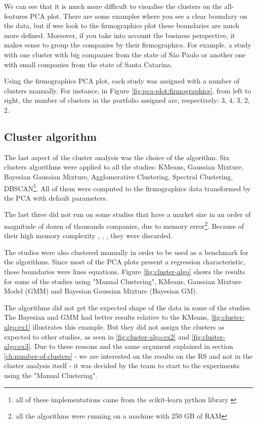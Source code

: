We can see that it is much more difficult to visualise the clusters on the all-features PCA plot. There are some examples where you see a clear boundary on the data, but if wee look to the firmographics plot these boundaries are much more defined. Moreover, if you take into account the business perspective, it makes sense to group the companies by their firmographics. For example, a study with one cluster with big companies from the state of São Paulo or another one with small companies from the state of Santa Catarina.

Using the firmographics PCA plot, each study was assigned with a number of clusters manually. For instance, in Figure \ref{fig:pca-plot:firmographics}, from left to right, the number of clusters in the portfolio assigned are, respectively: 3, 4, 3, 2, 2.  


\subsection{Cluster algorithm}
\label{ch:cluster-algorithm}

The last aspect of the cluster analysis was the choice of the algorithm. Six clusters algorithms were applied to all the studies: KMeans, Gaussian Mixture, Bayesian Gaussian Mixture, Agglomerative Clustering, Spectral Clustering, DBSCAN\footnote{all of these implementations came from the scikit-learn python library \cite{scikit-learn}}. All of them were computed to the firmographics data transformed by the PCA with default parameters.

The last three did not run on some studies that have a market size in an order of magnitude of dozen of thousands companies, due to memory error\footnote{all the algorithms were running on a machine with 250 GB of RAM}. Because of their high memory complexity \cite{franti2006fast}, \cite{ester1996density}, \cite{yan2009fast}, they were discarded.

The studies were also clustered manually in order to be used as a benchmark for the algorithms. Since most of the PCA plots present a regression characteristic, these boundaries were lines equations. Figure \ref{fig:cluster-algo} shows the results for some of the studies using "Manual Clustering", KMeans, Gaussian Mixture Model (GMM) and Bayesian Gaussian Mixture (Bayesian GM).

The algorithms did not get the expected shape of the data in some of the studies. The Bayesian and GMM had better results relative to the KMeans, \ref{fig:cluster-algo:ex1} illustrates this example. But they did not assign the clusters as expected to other studies, as seen in \ref{fig:cluster-algo:ex2} and \ref{fig:cluster-algo:ex3}. Due to these reasons and the same argument explained in section \ref{ch:number-of-clusters} - we are interested on the results on the RS and not in the cluster analysis itself - it was decided by the team to start to the experiments using the "Manual Clustering".

